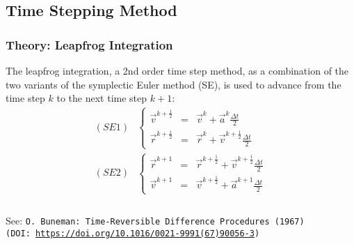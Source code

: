 \subsection{Time Stepping Method}
\begin{frame}[fragile]
  \frametitle{Theory: Leapfrog Integration}
  The leapfrog integration, a 2nd order time step method, as a combination of the two variants of the symplectic Euler method (SE), is used to advance from the time step $k$ to the next time step $k + 1$:
  \begin{equation*}
    \begin{split}
      (SE1) &\left\lbrace
      \begin{array}{rcl}
        \vec{v}^{k+\frac{1}{2}} & = & \vec{v}^k + \vec{a}^k \frac{\Delta t}{2}               \\
        \vec{r}^{k+\frac{1}{2}} & = & \vec{r}^k + \vec{v}^{k + \frac{1}{2}} \frac{\Delta t}{2}
      \end{array}\right.\\[.5em]
      (SE2) &\left\lbrace
      \begin{array}{rcl}
        \vec{r}^{k+1} & = & \vec{r}^{k + \frac{1}{2}} + \vec{v}^{k + \frac{1}{2}} \frac{\Delta t}{2} \\
        \vec{v}^{k+1} & = & \vec{v}^{k + \frac{1}{2}} + \vec{a}^{k+1} \frac{\Delta t}{2}
      \end{array}\right.\\
    \end{split}
  \end{equation*} \\
  \vfill
  \setfontsize{8pt}
  See: \texttt{O. Buneman: Time-Reversible Difference Procedures (1967)\\[-.5em]
  (DOI: \url{https://doi.org/10.1016/0021-9991(67)90056-3})}
\end{frame}

